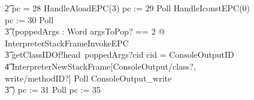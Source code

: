 \begin{figure}[tp!]
{\begin{circus}
    \t2 {} \circelse pc = 28 \circthen HandleAloadEPC(3) \circseq pc := 29 \circseq Poll \circseq HandleIconstEPC(0) \circseq pc := 30 \circseq Poll \circseq \\
    \t3 (\circvar poppedArgs : Word \circspot \lschexpract \exists argsToPop? == 2 @ InterpreterStackFrameInvokeEPC \rschexpract \circseq \\
    \t3 getClassIDOf!head~poppedArgs?cid \then \circif cid = ConsoleOutputID \circthen {} \\
    \t4 \lschexpract InterpreterNewStackFrame[ConsoleOutput/class?, write/methodID?] \rschexpract \circseq  Poll \circseq ConsoleOutput\_write \\
    \t3 \circfi) \circseq pc := 31 \circseq Poll \circseq pc := 35 \\

\end{circus}}
\end{figure}

